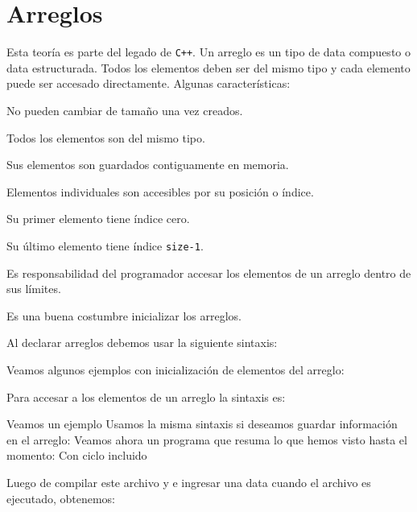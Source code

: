 \chapter{Arreglos}

Esta teoría es parte del legado de \texttt{C++}. Un arreglo es un tipo de data compuesto o data estructurada. Todos los elementos deben ser del mismo tipo y cada elemento puede ser accesado directamente. Algunas características:
\begin{compactitem}
	\item No pueden cambiar de tamaño una vez creados.
	\item Todos los elementos son del mismo tipo.
	\item Sus elementos son guardados contiguamente en memoria.
	\item Elementos individuales son accesibles por su posición o índice.
	\item Su primer elemento tiene índice cero.
	\item Su último elemento tiene índice \texttt{size-1}.
	\item Es responsabilidad del programador accesar los elementos de un arreglo dentro de sus límites.
	\item Es una buena costumbre inicializar los arreglos.
\end{compactitem}

Al declarar arreglos debemos usar la siguiente sintaxis:
\begin{center}
\end{center}

Veamos algunos ejemplos con inicialización de elementos del arreglo:

Para accesar a los elementos de un arreglo la sintaxis es:
\begin{center}
\end{center}
Veamos un ejemplo
Usamos la misma sintaxis si deseamos guardar información en el arreglo:
Veamos ahora un programa que resuma lo que hemos visto hasta el momento:
Con ciclo incluido
\immediate{}
\immediate{}
Luego de compilar este archivo y e ingresar una data cuando el archivo es ejecutado, obtenemos:
\immediate{}
\immediate{}
